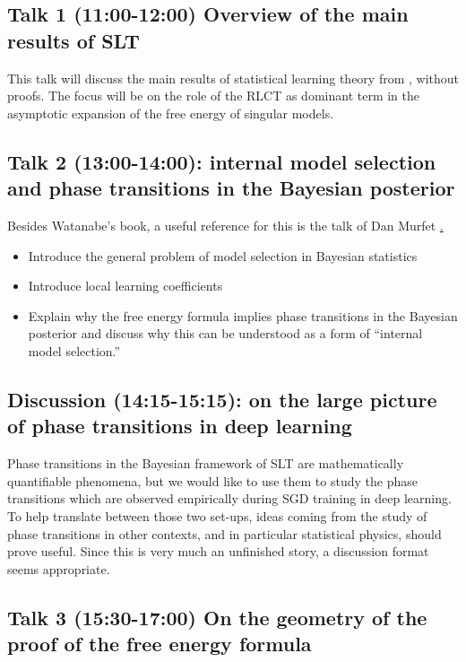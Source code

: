 \documentclass[a4paper,11pt]{amsart}
\begin{document}
\subsection*{Talk 1 (11:00-12:00) Overview of the main results of SLT}

This talk will discuss the main results of statistical learning theory from \cite{grey-book,green-book}, without proofs. The focus will be on the role of the RLCT as dominant term in the asymptotic expansion of the free energy of singular models.

\subsection*{Talk 2 (13:00-14:00): internal model selection and phase transitions in the Bayesian posterior}

Besides Watanabe's book, a useful reference for this is the talk of Dan Murfet \href{https://www.youtube.com/watch?v=UBY7xc1LZ6E&t=4364s}.

\begin{itemize}
\item Introduce the general problem of model selection in Bayesian statistics \cite[\S 8.1]{green-book}
\item Introduce local learning coefficients \cite{lambdahat}
\item Explain why the free energy formula implies phase transitions in the Bayesian posterior and discuss why this can be understood as a form of ``internal model selection.''\cite[\S 7.6]{grey-book} \cite[\S 9.4]{green-book}

\end{itemize}

\subsection*{Discussion (14:15-15:15): on the large picture of phase transitions in deep learning}

Phase transitions in the Bayesian framework of SLT are mathematically quantifiable phenomena, but we would like to use them to study the phase transitions which are observed empirically during SGD training in deep learning. To help translate between those two set-ups, ideas coming from the study of phase transitions in other contexts, and in particular statistical physics, should prove useful. Since this is very much an unfinished story, a discussion format seems appropriate.

\subsection*{Talk 3 (15:30-17:00) On the geometry of the proof of the free energy formula}
\end{document}
